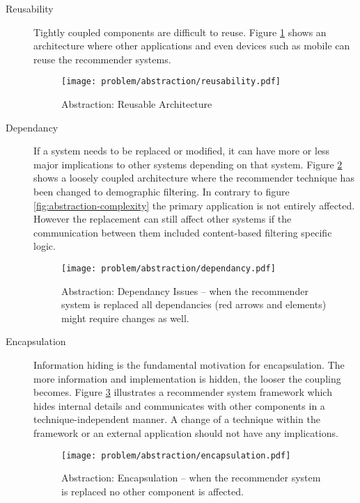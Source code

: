 \begin{description}
    \item[Reusability] Tightly coupled components are difficult to reuse. Figure \ref{fig:abstraction-resuability} shows an architecture where other applications and even devices such as mobile can reuse the recommender systems.

    \begin{figure}[H]
        \texttt{[image: problem/abstraction/reusability.pdf]}
        \caption{Abstraction: Reusable Architecture}
        \label{fig:abstraction-resuability}
    \end{figure}

    \item[Dependancy] If a system needs to be replaced or modified, it can have more or less major implications to other systems depending on that system. Figure \ref{fig:abstraction-dependancy} shows a loosely coupled architecture where the recommender technique has been changed to demographic filtering. In contrary to figure \ref{fig:abstraction-complexity} the primary application is not entirely affected. However the replacement can still affect other systems if the communication between them included content-based filtering specific logic.

    \begin{figure}[H]
        \texttt{[image: problem/abstraction/dependancy.pdf]}
        \caption[Abstraction: Dependancy Issues]{Abstraction: Dependancy Issues -- when the recommender system is replaced all dependancies (red arrows and elements) might require changes as well.}
        \label{fig:abstraction-dependancy}
    \end{figure}

    \item[Encapsulation] Information hiding is the fundamental motivation for encapsulation. The more information and implementation is hidden, the looser the coupling becomes. Figure \ref{fig:abstraction-encapsulation} illustrates a recommender system framework which hides internal details and communicates with other components in a technique-independent manner. A change of a technique within the framework or an external application should not have any implications.

    \begin{figure}[H]
        \texttt{[image: problem/abstraction/encapsulation.pdf]}
        \caption[Abstraction: Encapsulation]{Abstraction: Encapsulation -- when the recommender system is replaced no other component is affected.}
        \label{fig:abstraction-encapsulation}
    \end{figure}
\end{description}

